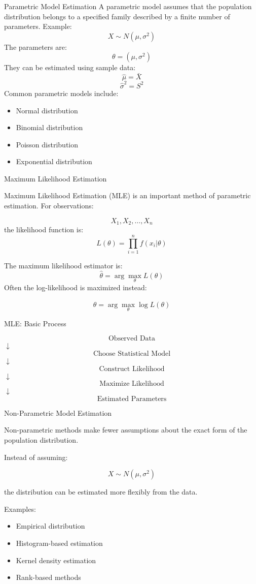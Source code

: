 \documentclass[aspectratio=169]{beamer}
\begin{document}
\begin{frame}{Parametric Model Estimation}
A parametric model assumes that the population distribution
belongs to a specified family described by a finite number
of parameters.
Example:
\[
X\sim N(\mu,\sigma^2)
\]
The parameters are:
\[
\theta=(\mu,\sigma^2)
\]
They can be estimated using sample data:
\[
\hat{\mu}=\bar X
\]
\[
\hat{\sigma}^2=S^2
\]
Common parametric models include:
\begin{itemize}
    \item Normal distribution
    \item Binomial distribution
    \item Poisson distribution
    \item Exponential distribution
\end{itemize}
\end{frame}

\begin{frame}{Maximum Likelihood Estimation}

Maximum Likelihood Estimation (MLE) is an important method
of parametric estimation.
For observations:

\[
X_1,X_2,\ldots,X_n
\]
the likelihood function is:
\[
\boxed{
L(\theta)
=
\prod_{i=1}^{n}f(x_i|\theta)
}
\]

The maximum likelihood estimator is:
\[
\boxed{
\hat{\theta}
=
\arg\max_{\theta}L(\theta)
}
\]
Often the log-likelihood is maximized instead:

\[
\boxed{
\hat{\theta}
=
\arg\max_{\theta}\log L(\theta)
}
\]
\end{frame}

\begin{frame}{MLE: Basic Process}
\begin{center}
\[
\boxed{\text{Observed Data}}
\]
$\downarrow$
\[
\boxed{\text{Choose Statistical Model}}
\]
$\downarrow$
\[
\boxed{\text{Construct Likelihood}}
\]
$\downarrow$
\[
\boxed{\text{Maximize Likelihood}}
\]
$\downarrow$
\[
\boxed{\text{Estimated Parameters}}
\]
\end{center}
\end{frame}

\begin{frame}{Non-Parametric Model Estimation}

Non-parametric methods make fewer assumptions about the exact
form of the population distribution.

Instead of assuming:

\[
X\sim N(\mu,\sigma^2)
\]

the distribution can be estimated more flexibly from the data.

Examples:

\begin{itemize}
    \item Empirical distribution
    \item Histogram-based estimation
    \item Kernel density estimation
    \item Rank-based methods
\end{itemize}
\end{frame}
\end{document}

